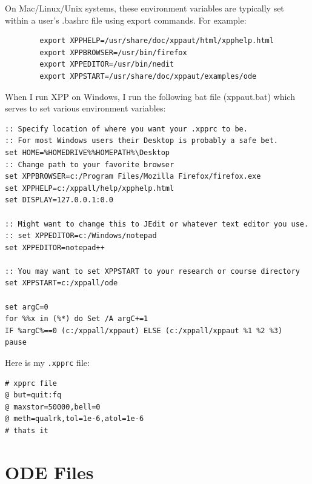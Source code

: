 \documentclass{article}
\begin{document}

On Mac/Linux/Unix systems, these environment variables are typically set within a user's .bashrc file using export commands.  For example:
{\color{red}\begin{verbatim}
        export XPPHELP=/usr/share/doc/xppaut/html/xpphelp.html
        export XPPBROWSER=/usr/bin/firefox
        export XPPEDITOR=/usr/bin/nedit
        export XPPSTART=/usr/share/doc/xppaut/examples/ode
\end{verbatim}}

When I run XPP on {Windows}, I run the following bat file (xppaut.bat) which serves
to set various environment variables:
{\color{red}
\begin{verbatim}
:: Specify location of where you want your .xpprc to be.
:: For most Windows users their Desktop is probably a safe bet.
set HOME=%HOMEDRIVE%%HOMEPATH%\Desktop
:: Change path to your favorite browser
set XPPBROWSER=c:/Program Files/Mozilla Firefox/firefox.exe
set XPPHELP=c:/xppall/help/xpphelp.html
set DISPLAY=127.0.0.1:0.0

:: Might want to change this to JEdit or whatever text editor you use.
:: set XPPEDITOR=c:/Windows/notepad
set XPPEDITOR=notepad++

:: You may want to set XPPSTART to your research or course directory
set XPPSTART=c:/xppall/ode

set argC=0
for %%x in (%*) do Set /A argC+=1
IF %argC%==0 (c:/xppall/xppaut) ELSE (c:/xppall/xppaut %1 %2 %3)
pause
\end{verbatim}}

Here is my {\tt .xpprc} file:
{\color{red}\begin{verbatim}
# xpprc file
@ but=quit:fq
@ maxstor=50000,bell=0
@ meth=qualrk,tol=1e-6,atol=1e-6
# thats it
\end{verbatim}}

\section{ODE Files}
\end{document}
